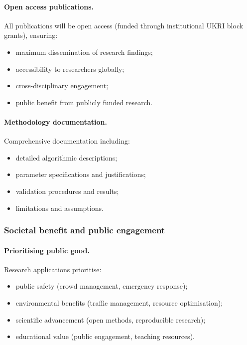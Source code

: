 \paragraph{Open access publications.}
All publications will be open access (funded through institutional UKRI block grants), ensuring:
\begin{itemize}
  \item maximum dissemination of research findings;
  \item accessibility to researchers globally;
  \item cross-disciplinary engagement;
  \item public benefit from publicly funded research.
\end{itemize}

\paragraph{Methodology documentation.}
Comprehensive documentation including:
\begin{itemize}
  \item detailed algorithmic descriptions;
  \item parameter specifications and justifications;
  \item validation procedures and results;
  \item limitations and assumptions.
\end{itemize}

\subsubsection{Societal benefit and public engagement}

\paragraph{Prioritising public good.}
Research applications prioritise:
\begin{itemize}
  \item public safety (crowd management, emergency response);
  \item environmental benefits (traffic management, resource optimisation);
  \item scientific advancement (open methods, reproducible research);
  \item educational value (public engagement, teaching resources).
\end{itemize}

